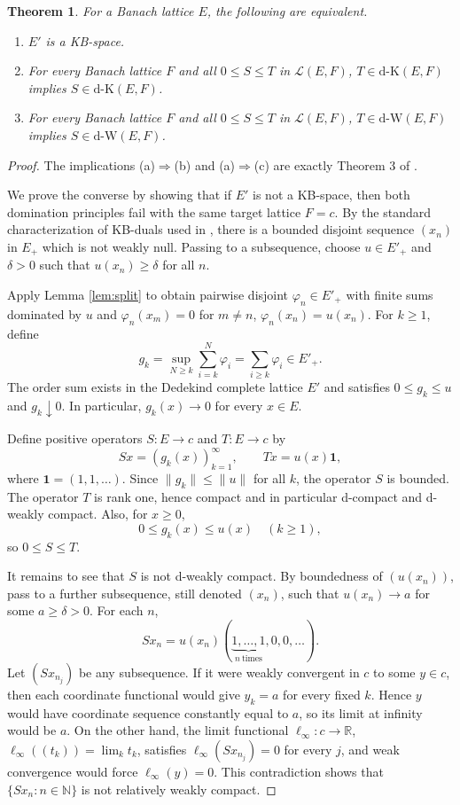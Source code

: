 \documentclass[11pt]{amsart}
\newtheorem{theorem}{Theorem}
\theoremstyle{remark}
\newcommand{\dK}{\mathrm{d\mbox{-}K}}
\newcommand{\dW}{\mathrm{d\mbox{-}W}}
\newcommand{\LL}{\mathcal L}
\newcommand{\N}{\mathbb N}
\begin{document}
\begin{theorem}\label{thm:main}
For a Banach lattice $E$, the following are equivalent.
\begin{enumerate}[label=\textup{(\alph*)},leftmargin=*]
\item $E'$ is a KB-space.
\item For every Banach lattice $F$ and all $0\le S\le T$ in $\LL(E,F)$,
      $T\in\dK(E,F)$ implies $S\in\dK(E,F)$.
\item For every Banach lattice $F$ and all $0\le S\le T$ in $\LL(E,F)$,
      $T\in\dW(E,F)$ implies $S\in\dW(E,F)$.
\end{enumerate}
\end{theorem}

\begin{proof}
The implications (a)$\Rightarrow$(b) and (a)$\Rightarrow$(c) are exactly
Theorem 3 of \cite{EEG2024}.

We prove the converse by showing that if $E'$ is not a KB-space, then both
domination principles fail with the same target lattice $F=c$.  By the
standard characterization of KB-duals used in \cite[Theorem 2.4.14]{Meyer},
there is a bounded disjoint sequence $(x_n)$ in $E_+$ which is not weakly null.
Passing to a subsequence, choose $u\in E'_+$ and $\delta>0$ such that
$u(x_n)\ge\delta$ for all $n$.

Apply Lemma \ref{lem:split} to obtain pairwise disjoint
$\varphi_n\in E'_+$ with finite sums dominated by $u$ and
$\varphi_n(x_m)=0$ for $m\ne n$, $\varphi_n(x_n)=u(x_n)$.  For $k\ge1$, define
\[
        g_k=\sup_{N\ge k}\sum_{i=k}^N\varphi_i
        =\sum_{i\ge k}\varphi_i\in E'_+ .
\]
The order sum exists in the Dedekind complete lattice $E'$ and satisfies
$0\le g_k\le u$ and $g_k\downarrow0$.  In particular, $g_k(x)\to0$ for every
$x\in E$.

Define positive operators $S:E\to c$ and $T:E\to c$ by
\[
        Sx=(g_k(x))_{k=1}^\infty,\qquad
        Tx=u(x)\mathbf 1 ,
\]
where $\mathbf 1=(1,1,\ldots)$.  Since $\|g_k\|\le\|u\|$ for all $k$, the
operator $S$ is bounded.  The operator $T$ is rank one, hence compact and in
particular d-compact and d-weakly compact.  Also, for $x\ge0$,
\[
        0\le g_k(x)\le u(x)\quad(k\ge1),
\]
so $0\le S\le T$.

It remains to see that $S$ is not d-weakly compact.  By boundedness of
$(u(x_n))$, pass to a further subsequence, still denoted $(x_n)$, such that
$u(x_n)\to a$ for some $a\ge\delta>0$.  For each $n$,
\[
        Sx_n
        = u(x_n)(\underbrace{1,\ldots,1}_{n\ \mathrm{times}},0,0,\ldots).
\]
Let $(Sx_{n_j})$ be any subsequence.  If it were weakly convergent in $c$ to
some $y\in c$, then each coordinate functional would give $y_k=a$ for every
fixed $k$.  Hence $y$ would have coordinate sequence constantly equal to $a$,
so its limit at infinity would be $a$.  On the other hand, the limit functional
$\ell_\infty:c\to\mathbb R$, $\ell_\infty((t_k))=\lim_k t_k$, satisfies
$\ell_\infty(Sx_{n_j})=0$ for every $j$, and weak convergence would force
$\ell_\infty(y)=0$.  This contradiction shows that $\{Sx_n:n\in\N\}$ is not
relatively weakly compact.


\end{proof}
\end{document}
